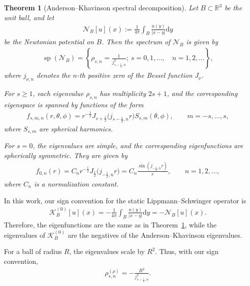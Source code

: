 \documentclass[10pt]{article}
\numberwithin{equation}{section}
\newtheorem{theorem}{Theorem}[section]
\newcommand{\upd}{\mathrm{d}}
\begin{document}
\begin{theorem}[Anderson--Khavinson spectral decomposition]
\label{thm:anderson_khavinson}
Let $B\subset \mathbb R^3$ be the unit ball, and let
\begin{align*}
    \mathcal N_B[u](x) := \frac{1}{4\pi} \int_B \frac{u(y)}{|x-y|}\upd y
\end{align*}
be the Newtonian potential on $B$. Then the spectrum of $\mathcal N_B$ is given by
\begin{align*}
    \operatorname{sp}(\mathcal N_B) =
    \left\{ \rho_{s,n} = \frac{1}{j_{s-\frac12,n}^2}; \ s=0,1,\dots,\quad n=1,2,\dots \right\},
\end{align*}
where $j_{\nu,n}$ denotes the $n$-th positive zero of the Bessel function $J_\nu$.

For $s\geq1$, each eigenvalue $\rho_{s,n}$ has multiplicity $2s+1$, and the corresponding eigenspace is spanned by functions of the form
\begin{align*}
    f_{s,m,n}(r,\theta,\phi) = r^{-\frac12} J_{s+\frac12} \bigl(j_{s-\frac12,n}r\bigr) S_{s,m}(\theta,\phi), \qquad m=-s,\dots,s,
\end{align*}
where $S_{s,m}$ are spherical harmonics.

For $s=0$, the eigenvalues are simple, and the corresponding eigenfunctions are spherically symmetric. They are given by
\begin{align*}
    f_{0,n}(r) = C_n r^{-\frac12} J_{\frac12} \bigl(j_{-\frac12,n}r\bigr) = C_n \frac{\sin(j_{-\frac12,n}r)}{r}, \qquad n=1,2,\dots,
\end{align*}
where $C_n$ is a normalization constant. 
\end{theorem}

In this work, our sign convention for the static Lippmann--Schwinger operator is
\begin{align*}
    \mathcal K_B^{(0)}[u](x) = -\frac{1}{4\pi} \int_B \frac{u(y)}{|x-y|} \upd y = -\mathcal N_B[u](x).
\end{align*}
Therefore, the eigenfunctions are the same as in Theorem~\ref{thm:anderson_khavinson}, while the eigenvalues of $\mathcal K_B^{(0)}$ are the negatives of the Anderson--Khavinson eigenvalues.

For a ball of radius $R$, the eigenvalues scale by $R^2$. Thus, with our sign convention,
\begin{align*}
    \rho_{s,n}^{(\rho)} = -\frac{R^2}{j_{s-\frac12,n}^2}.
\end{align*}
\end{document}
